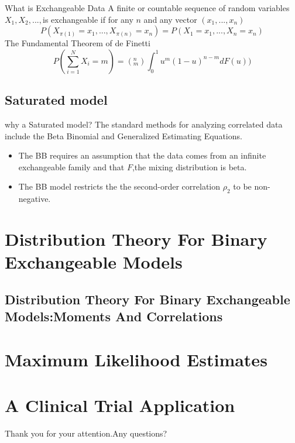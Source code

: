 \documentclass{beamer}
\begin{document}
\begin{frame}[t]{What is Exchangeable Data}
A finite or countable sequence of random variables $X_1,X_2,..., $is
exchangeable if for any $n$ and any vector $(x_1,...,x_n)$\\
\begin{equation}
P(X_{\pi(1)}=x_1,...,X_{\pi(n)}=x_n)=P(X_{1}=x_1,...,X_{n}=x_n)
\end{equation}
The Fundamental Theorem of de Finetti
\begin{equation}
P(\sum^N_{i=1}X_{i}=m)=(^{n}_{m})\int^{1}_{0}u^{m}(1-u)^{n-m}dF(u))
\end{equation}

\end{frame}

\subsection{Saturated model}
\begin{frame}[t]{why  a Saturated model?}
The standard methods for analyzing correlated data include the Beta
Binomial and Generalized Estimating Equations.
\begin{itemize}
\item The BB requires an assumption that the data comes from an
infinite exchangeable family and that $F$,the mixing distribution is
beta.
\item The BB model restricts the the second-order correlation
$\rho_2$ to  be non-negative.
\end{itemize}
\end{frame}










\section{Distribution Theory For Binary Exchangeable Models}
\subsection{Distribution Theory For Binary Exchangeable Models:Moments And Correlations}








\section{Maximum Likelihood Estimates}











\section{A Clinical Trial Application}





\begin{frame}
Thank you for your attention.Any questions?
\end{frame}
\end{document}

